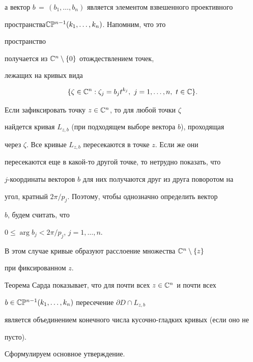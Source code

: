а вектор $b\,{=}\,(b_1,\dotsc,b_n)$ является элементом взвешенного проективного


пространства\linebreak $\Bbb C\Bbb P^{n-1}(k_1,\dotsc,k_n)$. Напомним, что это


пространство


получается из $\Bbb C^n\setminus\{0\}$ отождествлением точек,


лежащих на кривых вида


$$


\{\zeta\in\Bbb C^n:\zeta_j=b_jt^{k_j},\ j=1,\dotsc,n,\ t\in\Bbb C\}.


$$





Если зафиксировать точку $z\in\Bbb{C}^n$, то для любой точки $\zeta$


найдется кривая $L_{z,b}$ (при подходящем выборе вектора $b$), проходящая


через $\zeta$. Все кривые $L_{z,b}$ пересекаются в точке $z$. Если же они


пересекаются еще в какой-то другой точке, то нетрудно показать, что


$j$-координаты векторов $b$ для них получаются друг из друга поворотом на


угол, кратный ${2\pi}/{p_j}$. Поэтому, чтобы однозначно определить вектор


$b$, будем считать, что


$0\le\arg{b_j}<{2\pi}/{p_j}$, $j=1,\dotsc,n$.


В этом случае кривые образуют расслоение множества $\Bbb{C}^n\setminus\{z\}$


при фиксированном $z$.





Теорема Сарда показывает, что для почти всех $z\in\Bbb{C}^n$ и почти всех


$b\in\Bbb C\Bbb P^{n-1}(k_1,\dotsc,k_n)$ пересечение $\partial D\cap L_{z,b}$


является объединением конечного числа кусочно-гладких кривых (если оно не


пусто).





Сформулируем основное утверждение.


